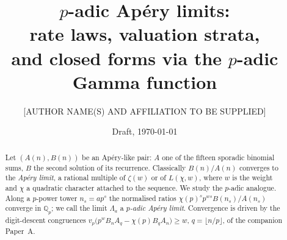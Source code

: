 \documentclass[11pt,reqno]{article}
\title{\bfseries $p$-adic Ap\'ery limits:\\ rate laws, valuation strata,\\ and
closed forms via the $p$-adic Gamma function}
\author{[AUTHOR NAME(S) AND AFFILIATION TO BE SUPPLIED]}
\date{Draft, \today}
\newcommand{\Qp}{\mathbb{Q}_p}
\newcommand{\vp}{v_p}
\newcommand{\floor}[1]{\lfloor #1 \rfloor}
\theoremstyle{plain}
\theoremstyle{definition}
\theoremstyle{remark}
\numberwithin{equation}{section}
\begin{document}
\maketitle

\begin{abstract}
Let $(A(n),B(n))$ be an Ap\'ery-like pair: $A$ one of the fifteen sporadic
binomial sums, $B$ the second solution of its recurrence.  Classically
$B(n)/A(n)$ converges to the \emph{Ap\'ery limit}, a rational multiple of
$\zeta(w)$ or of $L(\chi,w)$, where $w$ is the weight and $\chi$ a quadratic
character attached to the sequence.  We study the $p$-adic analogue.  Along a
$p$-power tower $n_s=ap^s$ the normalised ratios $\chi(p)^{s}p^{ws}B(n_s)/A(n_s)$
converge in $\Qp$; we call the limit $\Lambda_a$ a \emph{$p$-adic Ap\'ery
limit}.  Convergence is driven by the digit-descent congruences
$\vp\bigl(p^{w}B_nA_q-\chi(p)B_qA_n\bigr)\ge w$, $q=\floor{n/p}$, of the
companion Paper~A.


\end{abstract}
\end{document}
